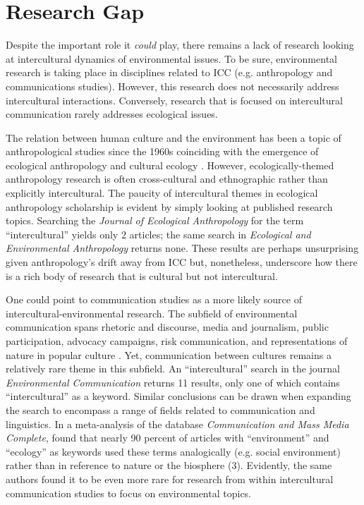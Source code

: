 \section{Research Gap}

Despite the important role it \textit{could} play, there remains a lack of research looking at intercultural dynamics of environmental issues. To be sure, environmental research is taking place in disciplines related to ICC (e.g. anthropology and communications studies). However, this research does not necessarily address intercultural interactions. Conversely, research that is focused on intercultural communication rarely addresses ecological issues.	

The relation between human culture and the environment has been a topic of anthropological studies since the 1960s \citep[154-157]{Kottak1999a,Perry2003a} coinciding with the emergence of ecological anthropology and cultural ecology \citep{Steward1972a}. However, ecologically-themed anthropology research is often cross-cultural and ethnographic rather than explicitly intercultural. The paucity of intercultural themes in ecological anthropology scholarship is evident by simply looking at published research topics. Searching the \textit{Journal of Ecological Anthropology} for the term ``intercultural'' yields only 2 articles; the same search in \textit{Ecological and Environmental Anthropology} returns none.  These results are perhaps unsurprising given anthropology's drift away from ICC \citep{Leeds-Hurwitz1987a} but, nonetheless, underscore how there is a rich body of research that is cultural but not intercultural. 

One could point to communication studies as a more likely source of intercultural-environmental research. The subfield of environmental communication \citep{Flor2004a, Corbett2006a} spans rhetoric and discourse, media and journalism, public participation, advocacy campaigns, risk communication, and representations of nature in popular culture \citep{Cox2010a}. Yet, communication between cultures remains a relatively rare theme in this subfield. An ``intercultural'' search in the journal \textit{Environmental Communication} returns 11 results, only one of which contains ``intercultural'' as a keyword. Similar conclusions can be drawn when expanding the search to encompass a range of fields related to communication and linguistics. In a meta-analysis of the database \textit{Communication and Mass Media Complete}, \cite*{Mendoza2016a} found that nearly 90 percent of articles with ``environment'' and ``ecology'' as keywords used these terms analogically (e.g. social environment) rather than in reference to nature or the biosphere (3). Evidently, the same authors found it to be even more rare for research from within intercultural communication studies to focus on environmental topics.

